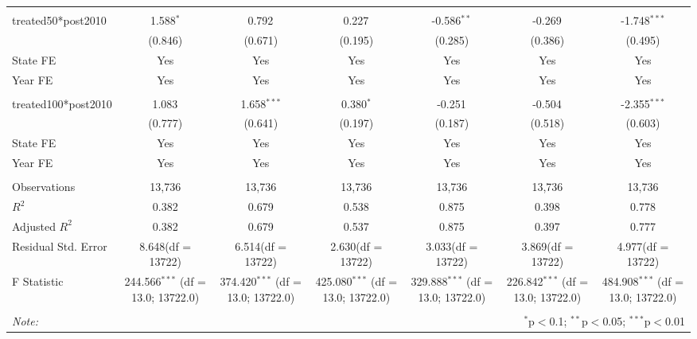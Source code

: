 \documentclass[12pt]{article}
\begin{document}
\begin{table}[!htbp]
\begin{tabular}{@{\extracolsep{5pt}}lcccccc}
\hline \\[-1.8ex]
 treated50*post2010 & 1.588$^{*}$ & 0.792$^{}$ & 0.227$^{}$ & -0.586$^{**}$ & -0.269$^{}$ & -1.748$^{***}$ \\
  & (0.846) & (0.671) & (0.195) & (0.285) & (0.386) & (0.495) \\
 State FE & Yes & Yes & Yes & Yes & Yes & Yes \\
 Year FE & Yes & Yes & Yes & Yes & Yes & Yes \\
\hline \\[-1.8ex]
 treated100*post2010 & 1.083$^{}$ & 1.658$^{***}$ & 0.380$^{*}$ & -0.251$^{}$ & -0.504$^{}$ & -2.355$^{***}$ \\
  & (0.777) & (0.641) & (0.197) & (0.187) & (0.518) & (0.603) \\
 State FE & Yes & Yes & Yes & Yes & Yes & Yes \\
 Year FE & Yes & Yes & Yes & Yes & Yes & Yes \\
\hline \\[-1.8ex]
 Observations & 13,736 & 13,736 & 13,736 & 13,736 & 13,736 & 13,736 \\
 $R^2$ & 0.382 & 0.679 & 0.538 & 0.875 & 0.398 & 0.778 \\
 Adjusted $R^2$ & 0.382 & 0.679 & 0.537 & 0.875 & 0.397 & 0.777 \\
 Residual Std. Error & 8.648(df = 13722) & 6.514(df = 13722) & 2.630(df = 13722) & 3.033(df = 13722) & 3.869(df = 13722) & 4.977(df = 13722)  \\
 F Statistic & 244.566$^{***}$ (df = 13.0; 13722.0) & 374.420$^{***}$ (df = 13.0; 13722.0) & 425.080$^{***}$ (df = 13.0; 13722.0) & 329.888$^{***}$ (df = 13.0; 13722.0) & 226.842$^{***}$ (df = 13.0; 13722.0) & 484.908$^{***}$ (df = 13.0; 13722.0) \\
\hline
\hline \\[-1.8ex]
\textit{Note:} & \multicolumn{6}{r}{$^{*}$p$<$0.1; $^{**}$p$<$0.05; $^{***}$p$<$0.01} \\
\end{tabular}
\end{table}
\end{document}
